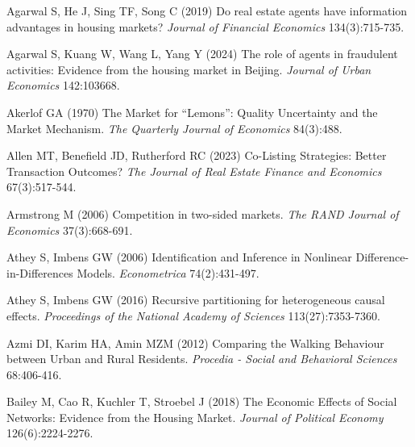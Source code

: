 \documentclass[11pt]{article}
\begin{document}
\clearpage
\begin{singlespace}
%
%
% 
% 

\begin{thebibliography}{}
Agarwal S, He J, Sing TF, Song C (2019) Do real estate agents have information advantages in housing markets? \textit{Journal of Financial Economics} 134(3):715-735.

Agarwal S, Kuang W, Wang L, Yang Y (2024) The role of agents in fraudulent activities: Evidence from the housing market in Beijing. \textit{Journal of Urban Economics} 142:103668.

Akerlof GA (1970) The Market for “Lemons”: Quality Uncertainty and the Market Mechanism. \textit{The Quarterly Journal of Economics} 84(3):488.

Allen MT, Benefield JD, Rutherford RC (2023) Co-Listing Strategies: Better Transaction Outcomes? \textit{The Journal of Real Estate Finance and Economics} 67(3):517-544.

Armstrong M (2006) Competition in two-sided markets. \textit{The RAND Journal of Economics} 37(3):668-691.

Athey S, Imbens GW (2006) Identification and Inference in Nonlinear Difference-in-Differences Models. \textit{Econometrica} 74(2):431-497.

Athey S, Imbens GW (2016) Recursive partitioning for heterogeneous causal effects. \textit{Proceedings of the National Academy of Sciences} 113(27):7353-7360.

Azmi DI, Karim HA, Amin MZM (2012) Comparing the Walking Behaviour between Urban and Rural Residents. \textit{Procedia - Social and Behavioral Sciences} 68:406-416.

Bailey M, Cao R, Kuchler T, Stroebel J (2018) The Economic Effects of Social Networks: Evidence from the Housing Market. \textit{Journal of Political Economy} 126(6):2224-2276.


\end{thebibliography}
\end{singlespace}
\end{document}
